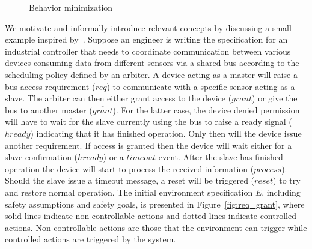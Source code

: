 \begin{figure}[bt]
	\centering
	\SmallPicture
	\caption{Behavior minimization}
	\label{fig:konig_original_plant_c}
	\MediumPicture
\end{figure}
\clearpage
We motivate and informally introduce relevant concepts by discussing a small example inspired by~\cite{DBLP:conf/vmcai/PitermanPS06}. Suppose an engineer is writing the specification for an industrial
controller that needs to coordinate communication between various devices consuming data from different sensors via a shared bus according to the scheduling policy defined by an arbiter. 
A device acting as a master will raise a bus access requirement ($req$) 
to communicate with a specific sensor acting as a slave. 
The arbiter can then either grant access to the device ($grant$) or give the bus
to another master ($\overline{grant}$). For the latter case, the device denied permission will have to wait for the slave currently using the bus to raise a
ready signal ($hready$) indicating that it has finished operation.  Only then
will the device issue another requirement.  If access is granted then the device
will wait either for a slave confirmation ($hready$) or a $timeout$ event.
After the slave has finished operation the device will start to process the
received information ($process$). Should the slave issue a timeout message, a reset will be triggered ($reset$) to try and restore normal operation.  
The initial environment specification $E$, including safety assumptions and safety goals, is presented in Figure~\ref{fig:req_grant}, where
solid lines indicate non controllable actions and dotted lines indicate
controlled actions.  Non controllable actions are those that the environment
can trigger while controlled actions are triggered by the system. 
